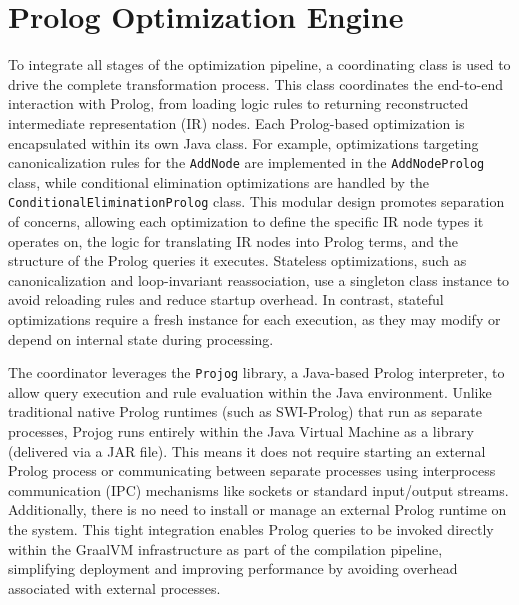 \section{Prolog Optimization Engine}

To integrate all stages of the optimization pipeline, a coordinating class is used to drive the complete transformation process. This class coordinates the end-to-end interaction with Prolog, from loading logic rules to returning reconstructed intermediate representation (IR) nodes. Each Prolog-based optimization is encapsulated within its own Java class. For example, optimizations targeting canonicalization rules for the \texttt{AddNode} are implemented in the \texttt{AddNodeProlog} class, while conditional elimination optimizations are handled by the \texttt{ConditionalEliminationProlog} class. This modular design promotes separation of concerns, allowing each optimization to define the specific IR node types it operates on, the logic for translating IR nodes into Prolog terms, and the structure of the Prolog queries it executes.
Stateless optimizations, such as canonicalization and loop-invariant reassociation, use a singleton class instance to avoid reloading rules and reduce startup overhead. In contrast, stateful optimizations require a fresh instance for each execution, as they may modify or depend on internal state during processing.

The coordinator leverages the \texttt{Projog} library, a Java-based Prolog interpreter, to allow query execution and rule evaluation within the Java environment.
Unlike traditional native Prolog runtimes (such as SWI-Prolog) that run as separate processes, Projog runs entirely within the Java Virtual Machine as a library (delivered via a JAR file). This means it does not require starting an external Prolog process or communicating between separate processes using interprocess communication (IPC) mechanisms like sockets or standard input/output streams. Additionally, there is no need to install or manage an external Prolog runtime on the system. This tight integration enables Prolog queries to be invoked directly within the GraalVM infrastructure as part of the compilation pipeline, simplifying deployment and improving performance by avoiding overhead associated with external processes.

